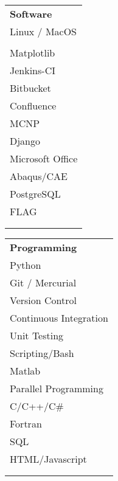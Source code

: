 \begin{minipage}{0.18\textwidth}
	\begin{center}
\begin{tabular}{l}
	{\large\textbf{Software}} \\
	\highskillbw Linux / MacOS \\ 
	\highskillbw {\fontfamily{ptm}\selectfont \LaTeX} \\ 
	\highskillbw Matplotlib \\ 
	\highskillbw Jenkins-CI \\
	\highskillbw Bitbucket \\
	\highskillbw Confluence \\
	\highskillbw \textsc{MCNP} \\
	\highskillbw Django  \\
	\highskillbw Microsoft Office \\
	\medskillbw Abaqus/CAE \\
	\medskillbw PostgreSQL \\
	\lowskillbw FLAG \\
	 \\
	\\
\end{tabular}
	\end{center}
\end{minipage}%
\begin{minipage}{0.23\textwidth}
	\begin{center}
\begin{tabular}{l}
	{\large\textbf{Programming}} \\
	\highskillbw Python \\
	\highskillbw Git / Mercurial \\
	\highskillbw Version Control \\
	\highskillbw Continuous Integration\\
	\highskillbw Unit Testing \\
	\highskillbw Scripting/Bash \\ 
	\highskillbw Matlab \\
	\medskillbw Parallel Programming \\
	\medskillbw C/C++/C\# \\
	\medskillbw Fortran \\
	\medskillbw SQL \\
	\lowskillbw HTML/Javascript \\
	\\
	\\
\end{tabular}
	\end{center}
\end{minipage}%
